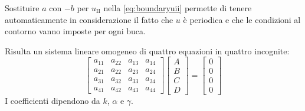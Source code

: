 Sostituire $a$ con $-b$ per $u_\mathrm{II}$ nella \eqref{eq:boundaryuii} permette di tenere automaticamente in considerazione il fatto che $u$ è periodica e che le condizioni al contorno vanno imposte per ogni buca.

Risulta un sistema lineare omogeneo di quattro equazioni in quattro incognite:
\begin{equation}
    \begin{bmatrix}
        a_{11} & a_{22} & a_{13} & a_{14} \\
        a_{21} & a_{22} & a_{23} & a_{24} \\
        a_{31} & a_{32} & a_{33} & a_{34} \\
        a_{41} & a_{42} & a_{43} & a_{44}
    \end{bmatrix}
    \begin{bmatrix}
        A \\ B \\ C \\ D
    \end{bmatrix}
    = \begin{bmatrix}
        0 \\ 0 \\ 0 \\ 0
    \end{bmatrix}
\end{equation}
I coefficienti dipendono da $k$, $\alpha$ e $\gamma$.

